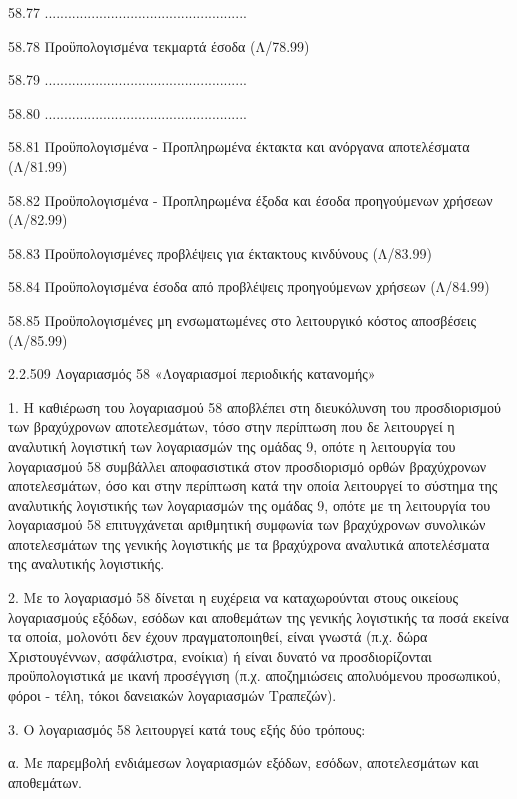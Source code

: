 \documentclass[A4,10pt,greek]{book}
\begin{document}
        58.77   ....................................................

        58.78   Προϋπολογισμένα τεκμαρτά έσοδα (Λ/78.99)

        58.79   ....................................................

        58.80   ....................................................

        58.81    Προϋπολογισμένα - Προπληρωμένα έκτακτα και ανόργανα
                     αποτελέσματα (Λ/81.99)

        58.82   Προϋπολογισμένα - Προπληρωμένα έξοδα και έσοδα προηγούμενων
                     χρήσεων (Λ/82.99)

        58.83   Προϋπολογισμένες προβλέψεις για έκτακτους κινδύνους (Λ/83.99)

        58.84   Προϋπολογισμένα έσοδα από προβλέψεις προηγούμενων χρήσεων
                     (Λ/84.99)

        58.85   Προϋπολογισμένες μη ενσωματωμένες στο λειτουργικό κόστος
                     αποσβέσεις (Λ/85.99)

2.2.509 Λογαριασμός 58 «Λογαριασμοί περιοδικής κατανομής»

1. Η καθιέρωση του λογαριασμού 58 αποβλέπει στη διευκόλυνση του προσδιορισμού των βραχύχρονων αποτελεσμάτων, τόσο στην περίπτωση που δε λειτουργεί η αναλυτική λογιστική των λογαριασμών της ομάδας 9, οπότε η λειτουργία του λογαριασμού 58 συμβάλλει αποφασιστικά στον προσδιορισμό ορθών βραχύχρονων αποτελεσμάτων, όσο και στην περίπτωση κατά την οποία λειτουργεί το σύστημα της αναλυτικής λογιστικής των λογαριασμών της ομάδας 9, οπότε με τη λειτουργία του λογαριασμού 58 επιτυγχάνεται αριθμητική συμφωνία των βραχύχρονων συνολικών αποτελεσμάτων της γενικής λογιστικής με τα βραχύχρονα αναλυτικά αποτελέσματα της αναλυτικής λογιστικής.

2. Με το λογαριασμό 58 δίνεται η ευχέρεια να καταχωρούνται στους οικείους λογαριασμούς εξόδων, εσόδων και αποθεμάτων της γενικής λογιστικής τα ποσά εκείνα τα οποία, μολονότι δεν έχουν πραγματοποιηθεί, είναι γνωστά (π.χ. δώρα Χριστουγέννων, ασφάλιστρα, ενοίκια) ή είναι δυνατό να προσδιορίζονται προϋπολογιστικά με ικανή προσέγγιση (π.χ. αποζημιώσεις απολυόμενου προσωπικού, φόροι - τέλη, τόκοι δανειακών λογαριασμών Τραπεζών).

3. Ο λογαριασμός 58 λειτουργεί κατά τους εξής δύο τρόπους:

α. Με παρεμβολή ενδιάμεσων λογαριασμών εξόδων, εσόδων, αποτελεσμάτων και αποθεμάτων.
\end{document}
